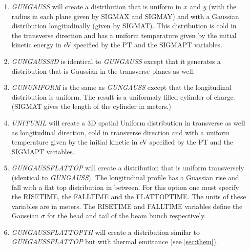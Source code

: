 \begin{enumerate}
\item {\it GUNGAUSS} will create a distribution that is uniform in $x$ and $y$ (with the
radius in each plane given by SIGMAX and SIGMAY) and with a Gaussian distribution longitudinally (given by SIGMAT).
This distribution is cold in the transverse direction and has a uniform temperature given by the initial kinetic energy in
eV specified by the PT and the SIGMAPT variables.
\item {\it GUNGAUSS3D} is identical to {\it GUNGAUSS} except that it generates a distribution that is Gaussian in the
transverse planes as well.
\item {\it GUNUNIFORM} is the same as {\it GUNGAUSS} except that the longitudinal distribution is uniform. The result is a
uniformaly filled cylinder of charge. (SIGMAT gives the length of the cylinder in meters.)
\item {\it UNITUNIL} will create a 3D spatial Uniform distribution in transverse as well as longitudinal direction, cold
in transverse direction and with a uniform temperature given by the initial kinetic in eV specified by the PT and the SIGMAPT variables.
\item {\it GUNGAUSSFLATTOP} will create a distribution that is uniform transversely (identical to {\it GUNGAUSS}). The longitudinal profile
has a Guassian rise and fall with a flat top distribution in between. For this option one must specify the RISETIME, the FALLTIME and the
FLATTOPTIME. The units of these variables are in meters. The RISETIME and FALLTIME variables define the Gaussian $\sigma$ for the
head and tail of the beam bunch respectively.   
\item {\it GUNGAUSSFLATTOPTH} will create a distribution similar to  {\it GUNGAUSSFLATTOP}  but with thermal emittance (see \ref{sec:them}). 

\end{enumerate}

